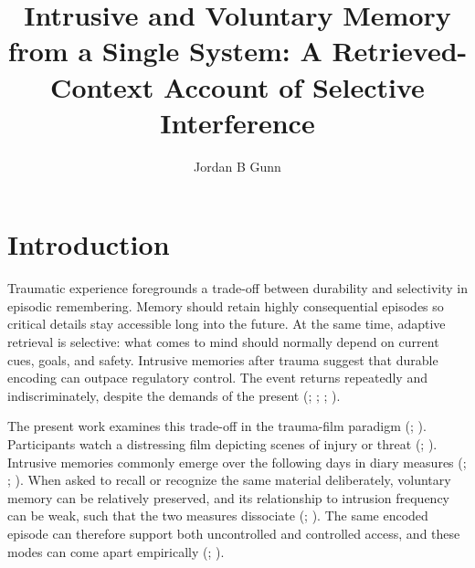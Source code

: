 \documentclass[
  man,
  floatsintext,
  longtable,
  nolmodern,
  notxfonts,
  notimes,
  draftfirst,
  colorlinks=true,linkcolor=blue,citecolor=blue,urlcolor=blue]{apa7}
\title{Intrusive and Voluntary Memory from a Single System: A
Retrieved-Context Account of Selective Interference}
\author{Jordan B Gunn}
\affiliation{
{Department of Psychology, University of Cambridge}}
\begin{document}
\maketitle


\setcounter{secnumdepth}{-\maxdimen} %

\setlength\LTleft{0pt}


\section{Introduction}\label{introduction}

Traumatic experience foregrounds a trade-off between durability and
selectivity in episodic remembering. Memory should retain highly
consequential episodes so critical details stay accessible long into the
future. At the same time, adaptive retrieval is selective: what comes to
mind should normally depend on current cues, goals, and safety.
Intrusive memories after trauma suggest that durable encoding can
outpace regulatory control. The event returns repeatedly and
indiscriminately, despite the demands of the present
(;
;
;
).

The present work examines this trade-off in the trauma-film paradigm
(;
). Participants watch
a distressing film depicting scenes of injury or threat
(;
). Intrusive memories
commonly emerge over the following days in diary measures
(;
;
). When asked to
recall or recognize the same material deliberately, voluntary memory can
be relatively preserved, and its relationship to intrusion frequency can
be weak, such that the two measures dissociate
(;
). The same encoded
episode can therefore support both uncontrolled and controlled access,
and these modes can come apart empirically
(;
).
\end{document}
